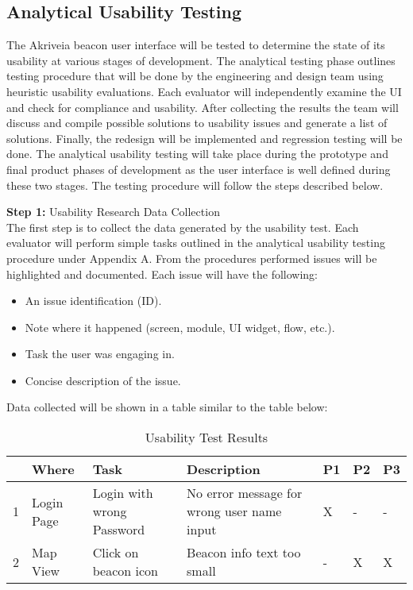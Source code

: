 

\subsection{Analytical Usability Testing}
\bigskip
The Akriveia beacon user interface will be tested to determine the state of its usability at various stages of development. The analytical testing phase outlines testing procedure that will be done by the engineering and design team using heuristic usability evaluations. Each evaluator will independently examine the UI and check for compliance and usability. After collecting the results the team will discuss and compile possible solutions to usability issues and generate a list of solutions. Finally, the redesign will be implemented and regression testing will be done. The analytical usability testing will take place during the prototype and final product phases of development as the user interface is well defined during these two stages. The testing procedure will follow the steps described below.

\bigskip



\textbf{Step 1:} Usability Research Data Collection\\
\medskip
The first step is to collect the data generated by the usability test. Each evaluator will perform simple tasks outlined in the analytical usability testing procedure under Appendix A. From the procedures performed issues will be highlighted and documented. Each issue will have the following:
\begin{itemize}
\setlength\itemsep{0.1mm}
	\item An issue identification (ID).
	\item Note where it happened (screen, module, UI widget, flow, etc.).
	\item Task the user was engaging in.
	\item Concise description of the issue.
\end{itemize}
Data collected will be shown in a table similar to the table below:

\def\arraystretch{1.5}
\begin{table}[H]
\centering
\begin{tabular}{ | p{0.5cm} | p{2cm}| p{5cm} | p{5cm} | p{0.5cm} | p{0.5cm} | p{0.5cm}|} 
\hline

\rowcolor{lightgray} \multicolumn{1}{|l|}{\textbf{ID}} & \textbf{Where} & \textbf{Task} &  \textbf{Description} & \textbf{P1} & \textbf{P2} & \textbf{P3} \\ 
\hline
1 & Login Page & Login with wrong Password & No error message for wrong user name input & X & - & - \\
\hline
2 & Map View & Click on beacon icon & Beacon info text too small & - & X & X \\
\hline
\end{tabular}
\caption{Usability Test Results}
\end{table}	



